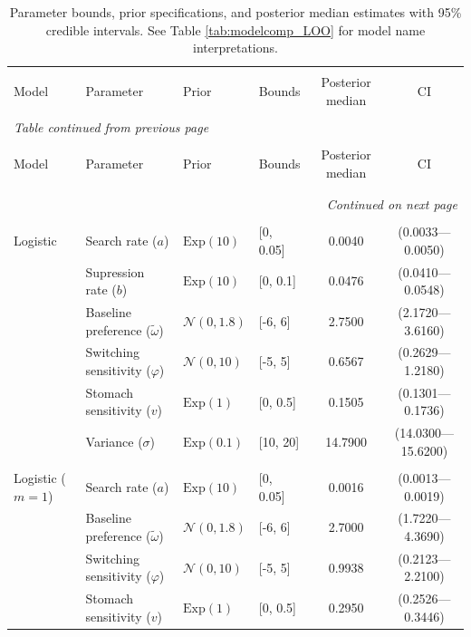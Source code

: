 \begingroup\footnotesize
\setlength{\tabcolsep}{3pt}
\begin{longtable}{@{} llllcc @{}}
\caption{Parameter bounds, prior specifications, and posterior median estimates with 95\% credible intervals.
    See Table \ref{tab:modelcomp_LOO} for model name interpretations.}\label{tab:priors_posteriors}\\
\hline\hline \\[-1.8ex]
Model & Parameter & Prior & Bounds & Posterior median & CI \\
\hline \\[-1.8ex]
\endfirsthead
\multicolumn{6}{l}{\textit{Table \thetable{} continued from previous page}}\\
\hline\hline \\[-1.8ex]
Model & Parameter & Prior & Bounds & Posterior median & CI \\
\hline \\[-1.8ex]
\endhead
\hline \\[-1.8ex]
\multicolumn{6}{r}{\textit{Continued on next page}} \\
\endfoot
\hline \\[-1.8ex]
\endlastfoot
Logistic & Search rate ($a$) & $\text{Exp}(10)$ & [0, 0.05] & 0.0040 & (0.0033---0.0050) \\
 & Supression rate ($b$) & $\text{Exp}(10)$ & [0, 0.1] & 0.0476 & (0.0410---0.0548) \\
 & Baseline preference ($\tilde{\omega}$) & $\mathcal{N}(0, 1.8)$ & [-6, 6] & 2.7500 & (2.1720---3.6160) \\
 & Switching sensitivity ($\varphi$) & $\mathcal{N}(0, 10)$ & [-5, 5] & 0.6567 & (0.2629---1.2180) \\
 & Stomach sensitivity ($v$) & $\text{Exp}(1)$ & [0, 0.5] & 0.1505 & (0.1301---0.1736) \\
 & Variance ($\sigma$) & $\text{Exp}(0.1)$ & [10, 20] & 14.7900 & (14.0300---15.6200) \\
\hline \\[-1.8ex]
Logistic ($m=1$) & Search rate ($a$) & $\text{Exp}(10)$ & [0, 0.05] & 0.0016 & (0.0013---0.0019) \\
 & Baseline preference ($\tilde{\omega}$) & $\mathcal{N}(0, 1.8)$ & [-6, 6] & 2.7000 & (1.7220---4.3690) \\
 & Switching sensitivity ($\varphi$) & $\mathcal{N}(0, 10)$ & [-5, 5] & 0.9938 & (0.2123---2.2100) \\
 & Stomach sensitivity ($v$) & $\text{Exp}(1)$ & [0, 0.5] & 0.2950 & (0.2526---0.3446) \\

\end{longtable}
